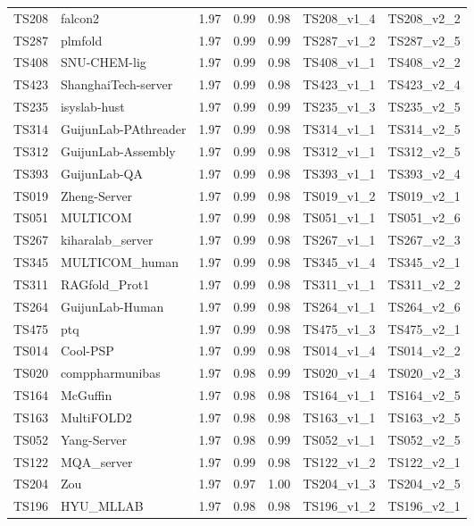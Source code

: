 \begin{longtable}{lllllll}
TS208 & falcon2 & 1.97 & 0.99 & 0.98 & TS208\_v1\_4 & TS208\_v2\_2 \\ 
TS287 & plmfold & 1.97 & 0.99 & 0.99 & TS287\_v1\_2 & TS287\_v2\_5 \\ 
TS408 & SNU-CHEM-lig & 1.97 & 0.99 & 0.98 & TS408\_v1\_1 & TS408\_v2\_2 \\ 
TS423 & ShanghaiTech-server & 1.97 & 0.99 & 0.98 & TS423\_v1\_1 & TS423\_v2\_4 \\ 
TS235 & isyslab-hust & 1.97 & 0.99 & 0.99 & TS235\_v1\_3 & TS235\_v2\_5 \\ 
TS314 & GuijunLab-PAthreader & 1.97 & 0.99 & 0.98 & TS314\_v1\_1 & TS314\_v2\_5 \\ 
TS312 & GuijunLab-Assembly & 1.97 & 0.99 & 0.98 & TS312\_v1\_1 & TS312\_v2\_5 \\ 
TS393 & GuijunLab-QA & 1.97 & 0.99 & 0.98 & TS393\_v1\_1 & TS393\_v2\_4 \\ 
TS019 & Zheng-Server & 1.97 & 0.99 & 0.98 & TS019\_v1\_2 & TS019\_v2\_1 \\ 
TS051 & MULTICOM & 1.97 & 0.99 & 0.98 & TS051\_v1\_1 & TS051\_v2\_6 \\ 
TS267 & kiharalab\_server & 1.97 & 0.99 & 0.98 & TS267\_v1\_1 & TS267\_v2\_3 \\ 
TS345 & MULTICOM\_human & 1.97 & 0.99 & 0.98 & TS345\_v1\_4 & TS345\_v2\_1 \\ 
TS311 & RAGfold\_Prot1 & 1.97 & 0.99 & 0.98 & TS311\_v1\_1 & TS311\_v2\_2 \\ 
TS264 & GuijunLab-Human & 1.97 & 0.99 & 0.98 & TS264\_v1\_1 & TS264\_v2\_6 \\ 
TS475 & ptq & 1.97 & 0.99 & 0.98 & TS475\_v1\_3 & TS475\_v2\_1 \\ 
TS014 & Cool-PSP & 1.97 & 0.99 & 0.98 & TS014\_v1\_4 & TS014\_v2\_2 \\ 
TS020 & comppharmunibas & 1.97 & 0.98 & 0.99 & TS020\_v1\_4 & TS020\_v2\_3 \\ 
TS164 & McGuffin & 1.97 & 0.98 & 0.98 & TS164\_v1\_1 & TS164\_v2\_5 \\ 
TS163 & MultiFOLD2 & 1.97 & 0.98 & 0.98 & TS163\_v1\_1 & TS163\_v2\_5 \\ 
TS052 & Yang-Server & 1.97 & 0.98 & 0.99 & TS052\_v1\_1 & TS052\_v2\_5 \\ 
TS122 & MQA\_server & 1.97 & 0.99 & 0.98 & TS122\_v1\_2 & TS122\_v2\_1 \\ 
TS204 & Zou & 1.97 & 0.97 & 1.00 & TS204\_v1\_3 & TS204\_v2\_5 \\ 
TS196 & HYU\_MLLAB & 1.97 & 0.98 & 0.98 & TS196\_v1\_2 & TS196\_v2\_1 \\ 

\end{longtable}
